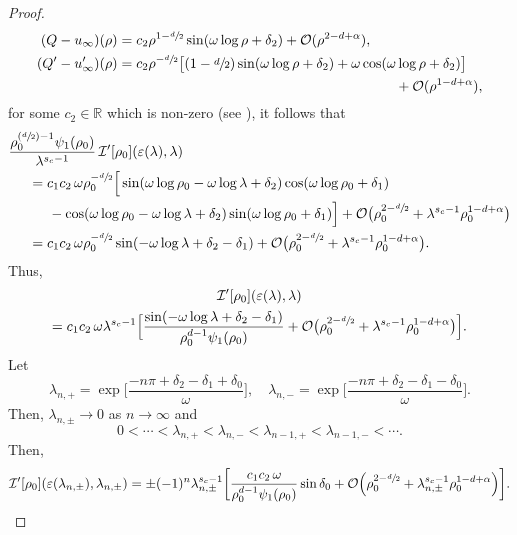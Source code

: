 \documentclass[10pt]{amsart}
\newcommand{\Psfrac}[2]{(\sfrac{#1}{#2})}
\theoremstyle{plain}
\theoremstyle{definition}
\begin{document}
\begin{proof}
\begin{equation}
\label{eq: Asymptote of Q}
\begin{aligned}
(Q-u_\infty )(\rho)&=c_2 \rho^{1-\sfrac{d}{2}}\sin (\omega\log \rho+\delta_2)+\mathcal O(\rho^{2-d+\alpha}),\\
(Q'-u_\infty ')(\rho)&=c_2 \rho^{-\sfrac{d}{2}}\big[(1-\sfrac{d}{2})\sin(\omega\log\rho+\delta_2)+\omega\cos (\omega\log\rho+\delta_2)\big]\\
&\hspace*{7cm}+\mathcal O(\rho^{1-d+\alpha}),
\end{aligned}
\end{equation}
for some $c_2\in\mathbb R$ which is non-zero (see \cite{L}), it follows that
\[
\begin{aligned}
&\frac{\rho_0^{\Psfrac{d}{2}-1}\psi_1(\rho_0)}{\lambda^{s_c-1}}\,\mathcal I'[\rho_0](\varepsilon(\lambda),\lambda)\\
&\hspace*{.5cm}=c_1c_2\,\omega \rho_0^{-\sfrac{d}{2}}\Big[\sin(\omega\log \rho_0-\omega\log\lambda +\delta_2)\cos(\omega\log\rho_0+\delta_1)\\
&\hspace*{1cm}-\cos(\omega\log\rho_0-\omega\log\lambda+\delta_2)\sin (\omega\log\rho_0+\delta_1)\Big]+\mathcal O\big(\rho_0^{2-\sfrac{d}{2}}+\lambda^{s_c-1}\rho_0^{1-d+\alpha}\big)\\
&\hspace*{.5cm}=c_1c_2\,\omega \rho_0^{-\sfrac{d}{2}}\sin(-\omega\log\lambda+\delta_2-\delta_1)+\mathcal O\big(\rho_0^{2-\sfrac{d}{2}}+\lambda^{s_c-1}\rho_0^{1-d+\alpha}\big).
\end{aligned}
\]
Thus,
\begin{multline}
\mathcal I'[\rho_0](\varepsilon(\lambda),\lambda)\\
=c_1c_2\,\omega\lambda^{s_c-1}\Big[\frac{\sin(-\omega\log\lambda+\delta_2-\delta_1)}{\rho_0^{d-1}\psi_1(\rho_0)}+\mathcal O\big(\rho_0^{2-\sfrac{d}{2}}+\lambda^{s_c-1}\rho_0^{1-d+\alpha}\big)\Big].
\end{multline}
Let
\begin{equation}
\label{eq:definitionoflambdakpm}
\lambda_{n,+}=\exp \Big[\frac{-n\pi+\delta_2-\delta_1+\delta_0}{\omega} \Big],\quad \lambda_{n,-}=\exp \Big[\frac{-n\pi+\delta_2-\delta_1-\delta_0}{\omega} \Big].
\end{equation}
Then, $\lambda_{n,\pm}\to 0$ as $n\to\infty$ and
\[
0<\cdots <\lambda_{n,+}<\lambda_{n,-}<\lambda_{n-1,+}<\lambda_{n-1,-}<\cdots.
\]
Then,
\[
\mathcal I'[\rho_0](\varepsilon(\lambda_{n,\pm}),\lambda_{n,\pm})= \pm(-1)^n \lambda_{n,\pm}^{s_c-1}\bigg[\frac{c_1c_2\,\omega}{\rho_0^{d-1}\psi_1(\rho_0)}\sin \delta_0+\mathcal O\Big(\rho_0^{2-\sfrac{d}{2}}+\lambda_{n,\pm}^{s_c-1}\rho_0^{1-d+\alpha}\Big)\bigg].
\]
\end{proof}
\end{document}
